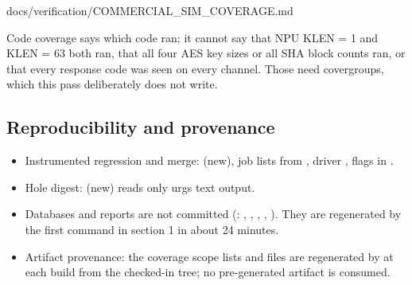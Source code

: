 \begin{relocated}{docs/verification/COMMERCIAL_SIM_COVERAGE.md}
{}

Code coverage says which code ran; it cannot say that NPU KLEN = 1 and
KLEN = 63 both ran, that all four AES key sizes or all SHA block counts
ran, or that every response code was seen on every channel. Those need
covergroups, which this pass deliberately does not write.

\subsection{Reproducibility and provenance}\label{tm:flow:commercial-sim-coverage:8-reproducibility-and-provenance}

\begin{itemize}
\tightlist
\item
  Instrumented regression and merge: 
  (new), job lists from , driver
  , flags in
  .
\item
  Hole digest:  (new) reads only
  urg\textquotesingle s text output.
\item
  Databases and reports are not committed (:
  , , ,
  , ). They are regenerated by
  the first command in section 1 in about 24 minutes.
\item
  Artifact provenance: the coverage scope lists and 
  files are regenerated by  at each build from the checked-in
   tree; no pre-generated artifact is consumed.
\end{itemize}
\end{relocated}

